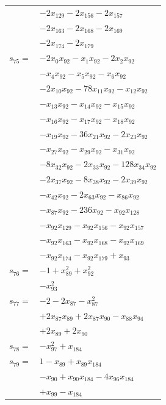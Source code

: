 \begin{longtable}{@{}r@{\;}l@{}}
 & \(\displaystyle -2x_{129} -2x_{156} -2x_{157}\) \\
 & \(\displaystyle -2x_{163} -2x_{168} -2x_{169}\) \\
 & \(\displaystyle -2x_{174} -2x_{179}\) \\[3pt]
\(s_{75}=\) & \(\displaystyle -2x_{0}x_{92} -x_{1}x_{92} -2x_{2}x_{92}\) \\
 & \(\displaystyle -x_{4}x_{92} -x_{5}x_{92} -x_{6}x_{92}\) \\
 & \(\displaystyle -2x_{10}x_{92} -78x_{11}x_{92} -x_{12}x_{92}\) \\
 & \(\displaystyle -x_{13}x_{92} -x_{14}x_{92} -x_{15}x_{92}\) \\
 & \(\displaystyle -x_{16}x_{92} -x_{17}x_{92} -x_{18}x_{92}\) \\
 & \(\displaystyle -x_{19}x_{92} -36x_{21}x_{92} -2x_{23}x_{92}\) \\
 & \(\displaystyle -x_{27}x_{92} -x_{29}x_{92} -x_{31}x_{92}\) \\
 & \(\displaystyle -8x_{32}x_{92} -2x_{33}x_{92} -128x_{34}x_{92}\) \\
 & \(\displaystyle -2x_{37}x_{92} -8x_{38}x_{92} -2x_{39}x_{92}\) \\
 & \(\displaystyle -x_{42}x_{92} -2x_{63}x_{92} -x_{86}x_{92}\) \\
 & \(\displaystyle -x_{87}x_{92} -236x_{92} -x_{92}x_{128}\) \\
 & \(\displaystyle -x_{92}x_{129} -x_{92}x_{156} -x_{92}x_{157}\) \\
 & \(\displaystyle -x_{92}x_{163} -x_{92}x_{168} -x_{92}x_{169}\) \\
 & \(\displaystyle -x_{92}x_{174} -x_{92}x_{179} +x_{93}\) \\[3pt]
\(s_{76}=\) & \(\displaystyle -1 +x_{89}^{2} +x_{92}^{2}\) \\
 & \(\displaystyle -x_{93}^{2}\) \\[3pt]
\(s_{77}=\) & \(\displaystyle -2 -2x_{87} -x_{87}^{2}\) \\
 & \(\displaystyle +2x_{87}x_{89} +2x_{87}x_{90} -x_{88}x_{94}\) \\
 & \(\displaystyle +2x_{89} +2x_{90}\) \\[3pt]
\(s_{78}=\) & \(\displaystyle -x_{97}^{2} +x_{184}\) \\[3pt]
\(s_{79}=\) & \(\displaystyle 1 -x_{89} +x_{89}x_{184}\) \\
 & \(\displaystyle -x_{90} +x_{90}x_{184} -4x_{96}x_{184}\) \\
 & \(\displaystyle +x_{99} -x_{184}\) \\[3pt]

\end{longtable}
